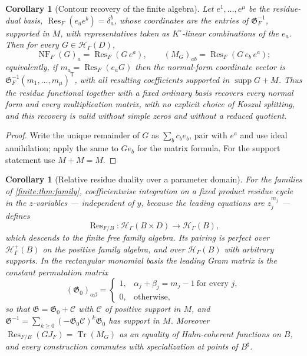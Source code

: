 \documentclass[11pt,letterpaper]{article}
\newtheorem{corollary}[theorem]{Corollary}
\theoremstyle{definition}
\theoremstyle{remark}
\newcommand{\HH}{\mathscr H}
\newcommand{\Hp}{\mathscr H^{+}}
\newcommand{\Kc}{K^{\circ}}
\newcommand{\sh}{^{\sharp}}
\newcommand{\Gram}{\mathfrak G}
\DeclareMathOperator{\supp}{supp}
\DeclareMathOperator{\NF}{NF}
\DeclareMathOperator{\Res}{Res}
\DeclareMathOperator{\Tr}{Tr}
\numberwithin{equation}{section}
\begin{document}
\begin{corollary}[Contour recovery of the finite algebra]
\label{finite:cor:residuereconstruction}
Let $e^1,\ldots,e^\mu$ be the residue-dual basis, $\Res_F(e_ae^b)=\delta_a^b$, whose coordinates are the entries of $\Gram_F^{-1}$, supported in $M$, with representatives taken as $\Kc$-linear combinations of the $e_a$. Then for every $G\in\HH_\Gamma(D)$,
\begin{equation}\label{finite:eq:residuenormalform}
 \NF_F(G)_a=\Res_F(G\,e^a),
 \qquad
 (M_G)_{ab}=\Res_F(G\,e_b\,e^a);
\end{equation}
equivalently, if $m_a=\Res_F(e_aG)$ then the normal-form coordinate vector is $\Gram_F^{-1}(m_1,\ldots,m_\mu)^{\mathsf T}$, with all resulting coefficients supported in $\supp G+M$. Thus the residue functional together with a fixed ordinary basis recovers every normal form and every multiplication matrix, with no explicit choice of Koszul splitting, and this recovery is valid without simple zeros and without a reduced quotient.
\end{corollary}

\begin{proof}
Write the unique remainder of $G$ as $\sum_bc_be_b$, pair with $e^a$ and use ideal annihilation; apply the same to $Ge_b$ for the matrix formula. For the support statement use $M+M=M$.
\end{proof}

\begin{corollary}[Relative residue duality over a parameter domain]
\label{finite:cor:relative}
For the families of \cref{finite:thm:family}, coefficientwise integration on a fixed product residue cycle in the $z$-variables --- independent of $y$, because the leading equations are $z_j^{m_j}$ --- defines
\[
 \Res_{F/B}:\HH_\Gamma(B\times D)\longrightarrow\HH_\Gamma(B),
\]
which descends to the finite free family algebra. Its pairing is perfect over $\Hp_\Gamma(B)$ on the positive family algebra, and over $\HH_\Gamma(B)$ with arbitrary supports. In the rectangular monomial basis the leading Gram matrix is the \emph{constant permutation matrix}
\begin{equation}\label{finite:eq:gramleading}
 (\Gram_0)_{\alpha\beta}=
 \begin{cases}1,&\alpha_j+\beta_j=m_j-1\ \text{for every }j,\\
 0,&\text{otherwise},\end{cases}
\end{equation}
so that $\Gram=\Gram_0+\mathcal C$ with $\mathcal C$ of positive support in $M$, and $\Gram^{-1}=\sum_{k\geq0}(-\Gram_0\mathcal C)^k\Gram_0$ has support in $M$. Moreover $\Res_{F/B}(GJ_F)=\Tr(M_G)$ as an equality of Hahn-coherent functions on $B$, and every construction commutes with specialization at points of $B\sh$.
\end{corollary}
\end{document}
